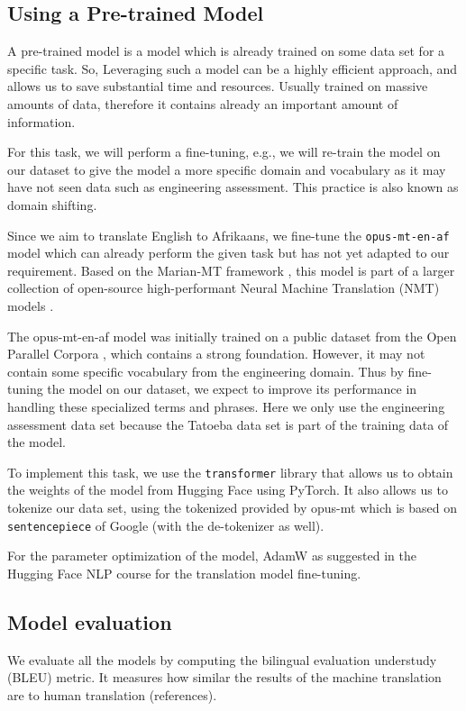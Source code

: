 \subsection{Using a Pre-trained Model}
A pre-trained model is a model which is already trained on some data set for a specific task. So, Leveraging such a model can be a highly efficient approach, and allows us to save substantial time and resources. Usually trained on massive amounts of data, therefore it contains already an important amount of information.

For this task, we will perform a fine-tuning, e.g., we will re-train the model on our dataset to give the model a more specific domain and vocabulary as it may have not seen data such as engineering assessment. This practice is also known as domain shifting.

Since we aim to translate English to Afrikaans, we fine-tune the \texttt{opus-mt-en-af} model which can already perform the given task but has not yet adapted to our requirement. Based on the Marian-MT framework \cite{marian}, this model is part of a larger collection of open-source high-performant Neural Machine Translation (NMT) models \cite{OPUSMT}.

The opus-mt-en-af model was initially trained on a public dataset from the Open Parallel Corpora \cite{opus}, which contains a strong foundation. However, it may not contain some specific vocabulary from the engineering domain. Thus by fine-tuning the model on our dataset, we expect to improve its performance in handling these specialized terms and phrases. Here we only use the engineering assessment data set because the Tatoeba data set is part of the training data of the model.

To implement this task, we use the \texttt{transformer} library that allows us to obtain the weights of the model from Hugging Face \cite{huggingface} using PyTorch. It also allows us to tokenize our data set, using the tokenized provided by opus-mt which is based on \texttt{sentencepiece} \cite{sentencepiece} of Google (with the de-tokenizer as well).

For the parameter optimization of the model, AdamW  \cite{AdamW} as suggested in the Hugging Face NLP course for the translation model fine-tuning.

\subsection{Model evaluation}
We evaluate all the models by computing the bilingual evaluation understudy (BLEU) metric. It measures how similar the results of the machine translation are to human translation (references).

